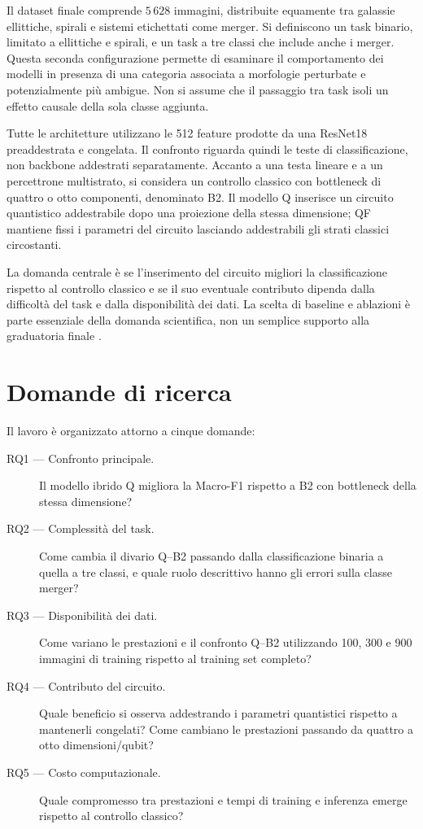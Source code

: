 Il dataset finale comprende \(5\,628\) immagini, distribuite equamente
tra galassie ellittiche, spirali e sistemi etichettati come merger.
Si definiscono un task binario, limitato a ellittiche e spirali, e un
task a tre classi che include anche i merger. Questa seconda
configurazione permette di esaminare il comportamento dei modelli in
presenza di una categoria associata a morfologie perturbate e potenzialmente
più ambigue. Non si assume che il passaggio tra task isoli un effetto
causale della sola classe aggiunta.

Tutte le architetture utilizzano le 512 feature prodotte da una ResNet18
preaddestrata e congelata. Il confronto riguarda quindi le teste di
classificazione, non backbone addestrati separatamente. Accanto a una
testa lineare e a un percettrone multistrato, si considera un controllo
classico con bottleneck di quattro o otto componenti, denominato B2.
Il modello Q inserisce un circuito quantistico addestrabile dopo una
proiezione della stessa dimensione; QF mantiene fissi i parametri
del circuito lasciando addestrabili gli strati classici circostanti.

La domanda centrale è se l'inserimento del circuito migliori la
classificazione rispetto al controllo classico e se il suo eventuale
contributo dipenda dalla difficoltà del task e dalla disponibilità
dei dati. La scelta di baseline e ablazioni è parte essenziale
della domanda scientifica, non un semplice supporto alla graduatoria
finale \cite{bowles2024benchmarking}.

\section{Domande di ricerca}
\label{sec:intro-rq}

Il lavoro è organizzato attorno a cinque domande:
\begin{description}
 \item[RQ1 --- Confronto principale.] Il modello ibrido Q migliora
 la Macro-F1 rispetto a B2 con bottleneck della stessa dimensione?
 \item[RQ2 --- Complessità del task.] Come cambia il divario Q--B2
 passando dalla classificazione binaria a quella a tre classi,
 e quale ruolo descrittivo hanno gli errori sulla classe merger?
 \item[RQ3 --- Disponibilità dei dati.] Come variano le prestazioni
 e il confronto Q--B2 utilizzando 100, 300 e 900 immagini di training
 rispetto al training set completo?
 \item[RQ4 --- Contributo del circuito.] Quale beneficio si osserva
 addestrando i parametri quantistici rispetto a mantenerli congelati?
 Come cambiano le prestazioni passando da quattro a otto dimensioni/qubit?
 \item[RQ5 --- Costo computazionale.] Quale compromesso tra prestazioni
 e tempi di training e inferenza emerge rispetto al controllo classico?
\end{description}

